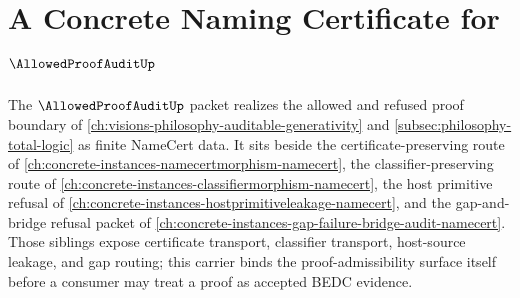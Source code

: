 \chapter{A Concrete Naming Certificate for $\AllowedProofAuditUp$}
\label{ch:concrete-instances-allowed-proof-audit-namecert}

The $\AllowedProofAuditUp$ packet realizes the allowed and refused proof boundary of \autoref{ch:visions-philosophy-auditable-generativity} and \autoref{subsec:philosophy-total-logic} as finite NameCert data. It sits beside the certificate-preserving route of \autoref{ch:concrete-instances-namecertmorphism-namecert}, the classifier-preserving route of \autoref{ch:concrete-instances-classifiermorphism-namecert}, the host primitive refusal of \autoref{ch:concrete-instances-hostprimitiveleakage-namecert}, and the gap-and-bridge refusal packet of \autoref{ch:concrete-instances-gap-failure-bridge-audit-namecert}. Those siblings expose certificate transport, classifier transport, host-source leakage, and gap routing; this carrier binds the proof-admissibility surface itself before a consumer may treat a proof as accepted BEDC evidence.

